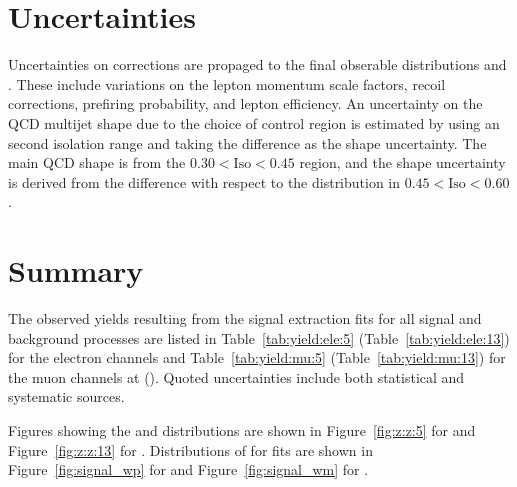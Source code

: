\section{Uncertainties}\label{ch:unc}
Uncertainties on corrections are propaged to the final obserable distributions \mt and \mll. These include variations on the lepton momentum scale factors, recoil corrections, prefiring probability, and lepton efficiency.
An uncertainty on the QCD multijet shape due to the choice of control region is estimated by using an second isolation range and taking the difference as the shape uncertainty. The main QCD \mt shape is from the $0.30 < \mathrm{Iso} < 0.45$ region, and the shape uncertainty is derived from the difference with respect to the \mt distribution in $0.45 < \mathrm{Iso} < 0.60$.

\section{Summary}

The observed yields resulting from the signal extraction fits for all signal and background processes are listed in Table~\ref{tab:yield:ele:5} (Table~\ref{tab:yield:ele:13}) for the electron channels and Table~\ref{tab:yield:mu:5} (Table~\ref{tab:yield:mu:13}) for the muon channels at \serag (\serah). Quoted uncertainties include both statistical and systematic sources.

Figures showing the \Zmm and \Zee \mll distributions are shown in Figure~\ref{fig:z:z:5} for \serag and Figure~\ref{fig:z:z:13} for \serah. Distributions of \mt for \W fits are shown in Figure~\ref{fig:signal_wp} for \Wp and Figure~\ref{fig:signal_wm} for \Wm.

 







